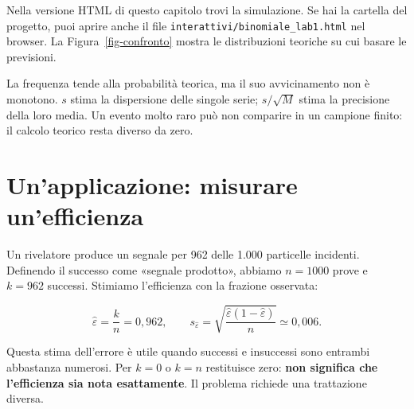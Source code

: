 \documentclass[
  italian,
  letterpaper,
  DIV=11,
  numbers=noendperiod]{scrreprt}
\begin{document}
\begin{tcolorbox}[enhanced jigsaw, arc=.35mm, bottomrule=.15mm, bottomtitle=1mm, breakable, colback=white, colbacktitle=quarto-callout-tip-color!10!white, colframe=quarto-callout-tip-color-frame, coltitle=black, left=2mm, leftrule=.75mm, opacityback=0, opacitybacktitle=0.6, rightrule=.15mm, title={Attività interattiva}, titlerule=0mm, toprule=.15mm, toptitle=1mm]

Nella versione HTML di questo capitolo trovi la simulazione. Se hai la
cartella del progetto, puoi aprire anche il file
\texttt{interattivi/binomiale\_lab1.html} nel browser. La
Figura~\ref{fig-confronto} mostra le distribuzioni teoriche su cui
basare le previsioni.

\end{tcolorbox}

\begin{tcolorbox}[enhanced jigsaw, arc=.35mm, bottomrule=.15mm, bottomtitle=1mm, breakable, colback=white, colbacktitle=quarto-callout-tip-color!10!white, colframe=quarto-callout-tip-color-frame, coltitle=black, left=2mm, leftrule=.75mm, opacityback=0, opacitybacktitle=0.6, rightrule=.15mm, title={Confronta le tue risposte}, titlerule=0mm, toprule=.15mm, toptitle=1mm]

La frequenza tende alla probabilità teorica, ma il suo avvicinamento non
è monotono. \(s\) stima la dispersione delle singole serie;
\(s/\sqrt M\) stima la precisione della loro media. Un evento molto raro
può non comparire in un campione finito: il calcolo teorico resta
diverso da zero.

\end{tcolorbox}

\section{Un'applicazione: misurare
un'efficienza}\label{unapplicazione-misurare-unefficienza}

Un rivelatore produce un segnale per 962 delle 1.000 particelle
incidenti. Definendo il successo come «segnale prodotto», abbiamo
\(n=1000\) prove e \(k=962\) successi. Stimiamo l'efficienza con la
frazione osservata:

\[
\hat\varepsilon=\frac{k}{n}=0{,}962,
\qquad
s_{\hat\varepsilon}=\sqrt{\frac{\hat\varepsilon(1-\hat\varepsilon)}{n}}
\simeq0{,}006.
\]

Questa stima dell'errore è utile quando successi e insuccessi sono
entrambi abbastanza numerosi. Per \(k=0\) o \(k=n\) restituisce zero:
\textbf{non significa che l'efficienza sia nota esattamente}. Il
problema richiede una trattazione diversa.
\end{document}
